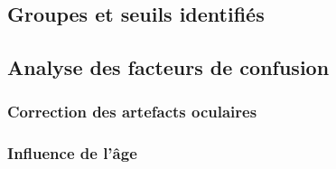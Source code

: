 \subsection{Groupes et seuils identifiés}

\subsection{Analyse des facteurs de confusion}

\subsubsection{Correction des artefacts oculaires}

\subsubsection{Influence de l'âge}